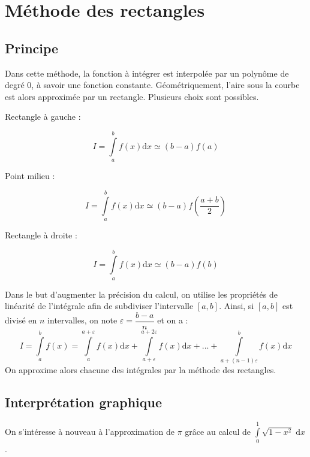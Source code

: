 \documentclass[10pt]{article}
\begin{document}
\section{Méthode des rectangles}
\subsection{Principe}
\begin{defi}
Dans cette méthode, la fonction à intégrer est interpolée par un polynôme de degré 0, à savoir une fonction constante. Géométriquement, l'aire sous la courbe est alors approximée par un rectangle. Plusieurs choix sont possibles.

\begin{minipage}[c]{.3\linewidth}
Rectangle à gauche :

$$
I = \int\limits_a^{b} f(x) \mathrm{d}x \simeq \left(b-a\right) f(a) 
$$
\end{minipage}\hfill
\begin{minipage}[c]{.3\linewidth}
Point milieu :

$$
I = \int\limits_a^{b} f(x) \mathrm{d}x \simeq \left(b-a\right) f\left(\dfrac{a+b}{2}\right) 
$$
\end{minipage}\hfill
\begin{minipage}[c]{.3\linewidth}
Rectangle à droite :

$$
I = \int\limits_a^{b} f(x) \mathrm{d}x \simeq \left(b-a\right) f(b) 
$$
\end{minipage}

\end{defi}

\begin{rem}
Dans le but d'augmenter la précision du calcul, on utilise les propriétés de linéarité de l'intégrale afin de subdiviser l'intervalle $[a,b]$. Ainsi, si $[a,b]$ est divisé en $n$ intervalles, on note $\varepsilon=\dfrac{b-a}{n}$ et on a :  
$$
I= \int\limits_a^{b} f(x) = \int\limits_{a}^{a+\varepsilon} f(x) \mathrm{d}x + \int\limits_{a+\varepsilon}^{a+2\varepsilon} f(x) \mathrm{d}x + ... + \int\limits_{a+(n-1)\varepsilon}^{b} f(x) \mathrm{d}x
$$
On approxime alors chacune des intégrales par la méthode des rectangles.
\end{rem}
\subsection{Interprétation graphique}

On s'intéresse à nouveau à l'approximation de $\pi$ grâce au calcul de $\int\limits_0^{1}\sqrt{1-x^2}\;\mathrm{d}x$ .
\end{document}
